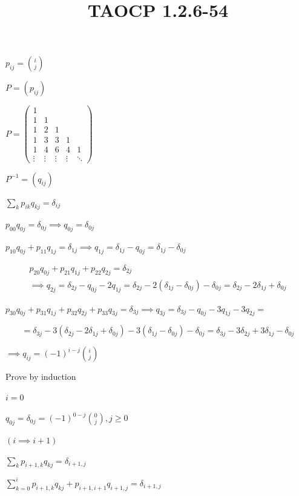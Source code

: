 \documentclass{article}
\title{TAOCP 1.2.6\mbox{-}54}
\begin{document}
\maketitle

\( p_{ij} = \binom{i}{j} \)

\( P = (p_{ij}) \)

\( P = \left(\begin{matrix}1\\1 & 1\\1& 2 & 1\\1 & 3 & 3 & 1 \\ 1 & 4 & 6 & 4 & 1 \\ \vdots & \vdots & \vdots & \vdots & \ddots  \end{matrix}\right) \)

\( P^{-1} = (q_{ij}) \)

\( \sum_{k} p_{ik}q_{kj} = \delta_{ij} \)

\( p_{00} q_{0j} = \delta_{0j} \implies q_{0j} = \delta_{0j} \)

\( p_{10} q_{0j} + p_{11} q_{1j} = \delta_{1j} \implies q_{1j} = \delta_{1j} - q_{0j} = \delta_{1j} - \delta_{0j} \)

\begin{multline*}
p_{20} q_{0j} + p_{21} q_{1j} + p_{22} q_{2j} = \delta_{2j} \\
\implies q_{2j} = \delta_{2j} - q_{0j} - 2q_{1j} = \delta_{2j} - 2(\delta_{1j} - \delta_{0j}) - \delta_{0j} = \delta_{2j} - 2\delta_{1j} + \delta_{0j}
\end{multline*}

\( p_{30} q_{0j} + p_{31} q_{1j} + p_{32} q_{2j} + p_{33} q_{3j} = \delta_{3j} \implies q_{3j} = \delta_{3j} - q_{0j} - 3 q_{1j} - 3 q_{2j} = \)

\[ = \delta_{3j} - 3(\delta_{2j} - 2\delta_{1j} + \delta_{0j}) - 3(\delta_{1j} - \delta_{0j}) - \delta_{0j} = \delta_{3j} - 3 \delta_{2j} + 3 \delta_{1j} - \delta_{0j} \]

\( \implies q_{ij} = {(-1)}^{i-j} \binom{i}{j} \)

Prove by induction

\( i = 0 \)

\( q_{0j} = \delta_{0j} = {(-1)}^{0-j} \binom{0}{j}, j \geq 0 \)

\( (i \implies i + 1) \)

\( \sum_{k} p_{i+1,k}q_{kj} = \delta_{i+1,j} \)

\( \sum_{k=0}^{i} p_{i+1,k}q_{kj} + p_{i+1,i+1}q_{i+1,j} = \delta_{i+1,j} \)
\end{document}
